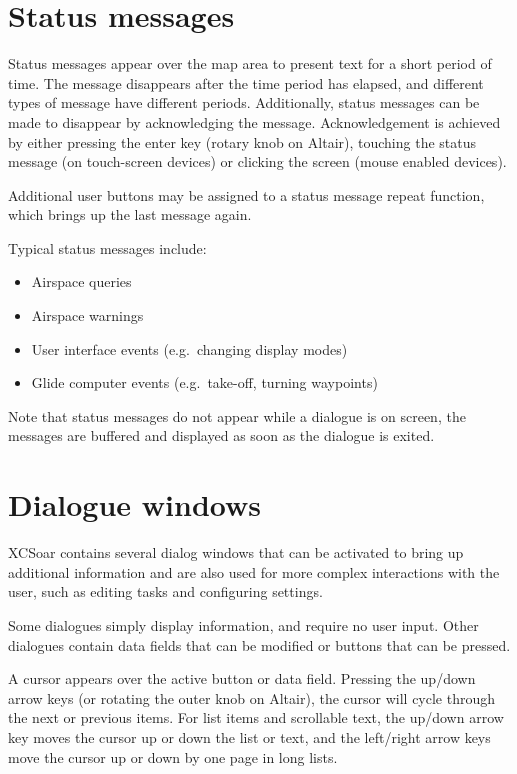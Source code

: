 \section{Status messages}
Status messages appear over the map area to present text for a short period of
time.  The message disappears after the time period has elapsed, and different
types of message have different periods. Additionally, status messages can be
made to disappear by acknowledging the message.  Acknowledgement is achieved by
either pressing the enter key (rotary knob on Altair), touching the status
message (on touch-screen devices) or clicking the screen (mouse enabled devices).

Additional user buttons may be assigned to a status message repeat function,
which brings up the last message again.

Typical status messages include:
\begin{itemize}
\item Airspace queries
\item Airspace warnings
\item User interface events (e.g.\ changing display modes)
\item Glide computer events (e.g.\ take-off, turning waypoints)
\end{itemize}

Note that status messages do not appear while a dialogue is on screen, the
messages are buffered and displayed as soon as the dialogue is exited.

\section{Dialogue windows}\label{sec:dialog-windows}

XCSoar contains several dialog windows that can be activated to bring up
additional information and are also used for more complex interactions with the
user, such as editing tasks and configuring settings.

Some dialogues simply display information, and require no user input. Other
dialogues contain data fields that can be modified or buttons that can be pressed.  

A cursor appears over the active button or data field. Pressing the up/down
arrow keys (or rotating the outer knob on Altair), the cursor will cycle
through the next or previous items. For list items and scrollable text, the
up/down arrow key moves the cursor up or down the list or text, and the
left/right arrow keys move the cursor up or down by one page in long lists.

